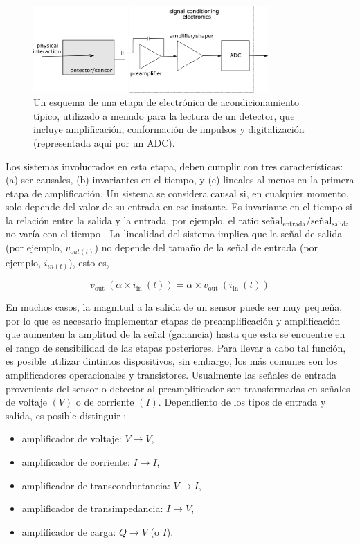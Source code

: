 \documentclass[]{book}
\begin{document}
\begin{figure}[h]
    \centering
    \includegraphics[width=0.8\textwidth]{front-end.png}
    \caption{Un esquema de una etapa de electrónica de acondicionamiento típico, utilizado a menudo para la lectura de un detector, que incluye amplificación, conformación de impulsos y digitalización (representada aquí por un ADC).}
    \label{fig:generic_frontend}

\end{figure}

\noindent Los sistemas involucrados en esta etapa, deben cumplir con tres características: (a) ser causales, (b) invariantes en el tiempo, y (c) lineales al menos en la primera etapa de amplificación. Un sistema se considera causal si, en cualquier momento, solo depende del valor de su entrada en ese instante. Es invariante en el tiempo si la relación entre la salida y la entrada, por ejemplo, el ratio $\text{señal}_{\text{entrada}}/\text{señal}_{\text{salida}}$ no varía con el tiempo \cite{kolanoski2020particle}. La linealidad del sistema implica que la señal de salida (por ejemplo, $v_{out(t)}$) no depende del tamaño de la señal de entrada (por ejemplo, $i_{in(t)}$), esto es, 

$$
v_{\text {out }}\left(\alpha \times i_{\text {in }}(t)\right)=\alpha \times v_{\text {out }}\left(i_{\text {in }}(t)\right)
$$

\noindent En muchos casos, la magnitud a la salida de un sensor puede ser muy pequeña, por lo que es necesario implementar etapas de preamplificación y amplificación que aumenten la amplitud de la señal (ganancia) hasta que esta se encuentre en el rango de sensibilidad de las etapas posteriores. Para llevar a cabo tal función, es posible utilizar dintintos dispositivos, sin embargo, los más comunes son los amplificadores operacionales y transistores. Usualmente las señales de entrada provenients del sensor o detector al preamplificador son transformadas en señales de voltaje $(V)$ o de corriente $(I)$. Dependiento de los tipos de entrada y salida, es posible distinguir \cite{kolanoski2020particle}:

\begin{itemize}
    \item amplificador de voltaje: $V \rightarrow V$,
    \item amplificador de corriente: $I \rightarrow I$,
    \item amplificador de transconductancia: $V \rightarrow I$,
    \item amplificador de transimpedancia: $I \rightarrow V$,
    \item amplificador de carga: $Q \rightarrow V$ (o $I$).
\end{itemize}
\end{document}
